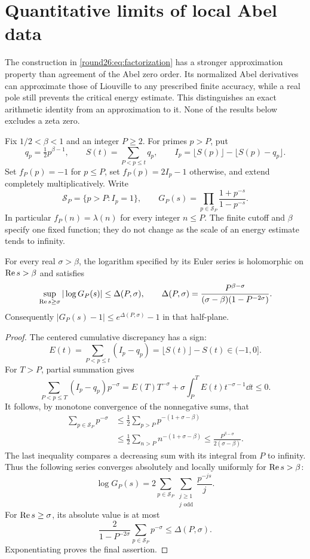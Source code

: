 \section{Quantitative limits of local Abel data}
\label{sec:abel-jet-stability}

The construction in \eqref{round26:eq:factorization} has a stronger
approximation property than agreement of the Abel zero order. Its
normalized Abel derivatives can approximate those of Liouville to any
prescribed finite accuracy, while a real pole still prevents the critical
energy estimate. This distinguishes an exact arithmetic identity from
an approximation to it. None of the results below excludes a zeta zero.

Fix $1/2<\beta<1$ and an integer $P\ge2$. For primes $p>P$, put
\[
 q_p=\tfrac12p^{\beta-1},\qquad
 S(t)=\sum_{P<p\le t}q_p,\qquad
 I_p=\lfloor S(p)\rfloor-\lfloor S(p)-q_p\rfloor.
\]
Set $f_P(p)=-1$ for $p\le P$, set $f_P(p)=2I_p-1$ otherwise,
and extend completely multiplicatively. Write
\[
 \mathcal S_P=\{p>P:I_p=1\},\qquad
 G_P(s)=\prod_{p\in\mathcal S_P}\frac{1+p^{-s}}{1-p^{-s}}.
\]
In particular $f_P(n)=\lambda(n)$ for every integer $n\le P$.
The finite cutoff and $\beta$ specify one fixed function; they do not
change as the scale of an energy estimate tends to infinity.

\begin{lemma}\label{lem:jet-euler-bound}
For every real $\sigma>\beta$, the logarithm specified by its Euler
series is holomorphic on $\operatorname{Re} s>\beta$ and satisfies
\begin{equation}\label{eq:jet-delta}
 \sup_{\operatorname{Re} s\ge\sigma}|\log G_P(s)|\le\Delta(P,\sigma),\qquad
 \Delta(P,\sigma)=
 \frac{P^{\beta-\sigma}}
 {(\sigma-\beta)(1-P^{-2\sigma})}.
\end{equation}
Consequently $|G_P(s)-1|\le e^{\Delta(P,\sigma)}-1$ in that half-plane.
\end{lemma}
\begin{proof}
The centered cumulative discrepancy has a sign:
\[
 E(t)=\sum_{P<p\le t}(I_p-q_p)=\lfloor S(t)\rfloor-S(t)\in(-1,0].
\]
For $T>P$, partial summation gives
\[
 \sum_{P<p\le T}(I_p-q_p)p^{-\sigma}
 =E(T)T^{-\sigma}
   +\sigma\int_P^T E(t)t^{-\sigma-1}\dd t\le0.
\]
It follows, by monotone convergence of the nonnegative sums, that
\begin{align*}
 \sum_{p\in\mathcal S_P}p^{-\sigma}
 &\le\tfrac12\sum_{p>P}p^{-(1+\sigma-\beta)}\\
 &\le\tfrac12\sum_{n>P}n^{-(1+\sigma-\beta)}
 \le\frac{P^{\beta-\sigma}}{2(\sigma-\beta)}.
\end{align*}
The last inequality compares a decreasing sum with its integral from
$P$ to infinity. Thus the following series converges absolutely and
locally uniformly for $\operatorname{Re} s>\beta$:
\[
 \log G_P(s)=2\sum_{p\in\mathcal S_P}
             \sum_{\substack{j\ge1\\j\text{ odd}}}\frac{p^{-js}}j.
\]
For $\operatorname{Re} s\ge\sigma$, its absolute value is at most
\[
 \frac{2}{1-P^{-2\sigma}}
       \sum_{p\in\mathcal S_P}p^{-\sigma}\le\Delta(P,\sigma).
\]
Exponentiating proves the final assertion.
\end{proof}

